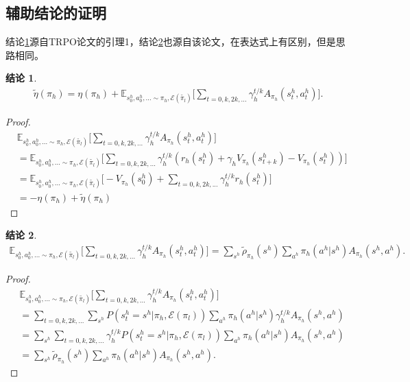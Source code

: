 \subsection{辅助结论的证明}
\label{sec:additional_proof}
结论\ref{conclusion:1}源自TRPO论文的引理1\cite{TRPO}，结论\ref{conclusion:2}也源自该论文，在表达式上有区别，但是思路相同。
\newtheorem{conclusion}{结论} %

\begin{conclusion}
\label{conclusion:1}
\begin{align}
  \tilde{\eta}(\pi_h) = \eta(\pi_h) + \mathbb{E}_{s_0^h, a_0^h, ... \sim \pi_h, \mathcal{E}(\tilde{\pi_l})}\Bigg[\sum_{t=0,k,2k,...} \gamma_h^{t/k} A_{\pi_h}(s_t^h, a_t^h)\Bigg].
\end{align}
\end{conclusion}

\begin{proof}
\begin{align}
  &\mathbb{E}_{s_0^h, a_0^h, ... \sim \pi_h, \mathcal{E}(\tilde{\pi_l})}\Bigg[\sum_{t=0,k,2k,...} \gamma_h^{t/k} A_{\pi_h}(s_t^h, a_t^h)\Bigg]\\
  &= \mathbb{E}_{s_0^h, a_0^h, ... \sim \pi_h, \mathcal{E}(\tilde{\pi_l})}\Bigg[
      \sum_{t = 0, k, 2k, ...}\gamma_h^{t/k}(r_h(s_t^h)+\gamma_h V_{\pi_h}(s_{t+k}^h) - V_{\pi_h}(s_t^h))
      \Bigg]\\
  &= \mathbb{E}_{s_0^h, a_0^h, ... \sim \pi_h, \mathcal{E}(\tilde{\pi_l})}\Bigg[
      -V_{\pi_h}(s_0^h) + \sum_{t=0,k,2k,...} \gamma_h^{t/k} r_h(s_t^h)
      \Bigg]\\
  &= -\eta(\pi_h) + \tilde{\eta}(\pi_h)
\end{align}
\end{proof}

\begin{conclusion}
\label{conclusion:2}
\begin{align}
    \mathbb{E}_{s_0^h, a_0^h, ... \sim \pi_h, \mathcal{E}(\tilde{\pi_l})}\Bigg[\sum_{t=0,k,2k,...} \gamma_h^{t/k} A_{\pi_h}(s_t^h, a_t^h)\Bigg] = \sum_{s^h}\tilde{\rho}_{\pi_h}(s^h)\sum_{a^h}\pi_h(a^h|s^h)A_{\pi_h}(s^h,a^h).
\end{align}
\end{conclusion}

\begin{proof}
\label{conclusion:3}
\begin{align}
  &\mathbb{E}_{s_0^h, a_0^h, ... \sim \pi_h, \mathcal{E}(\tilde{\pi_l})}\Bigg[\sum_{t=0,k,2k,...} \gamma_h^{t/k} A_{\pi_h}(s_t^h, a_t^h)\Bigg]\\
  &= \sum_{t = 0,k,2k,...} \sum_{s^h} P(s_t^h = s^h| \pi_h, \mathcal{E}(\pi_l)) \sum_{a^h} \pi_h(a^h|s^h) \gamma_h^{t/k} A_{\pi_h}(s^h, a^h)\\
  &= \sum_{s^h} \sum_{t = 0,k,2k,...} \gamma_h^{t/k} P(s_t^h = s^h|\pi_h, \mathcal{E}(\pi_l)) \sum_{a^h}\pi_h(a^h|s^h)A_{\pi_h}(s^h,a^h)\\
  &= \sum_{s^h}\tilde{\rho}_{\pi_h}(s^h)\sum_{a^h}\pi_h(a^h|s^h)A_{\pi_h}(s^h,a^h).
\end{align}
\end{proof}

